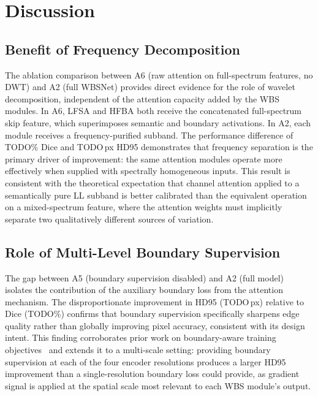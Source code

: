 \documentclass[journal]{IEEEtran}
\begin{document}
\section{Discussion}\label{sec:discussion}

\subsection{Benefit of Frequency Decomposition}

The ablation comparison between A6 (raw attention on full-spectrum features,
no DWT) and A2 (full WBSNet) provides direct evidence for the role of
wavelet decomposition, independent of the attention capacity added by the WBS
modules.
In A6, LFSA and HFBA both receive the concatenated full-spectrum skip feature,
which superimposes semantic and boundary activations.
In A2, each module receives a frequency-purified subband.
The performance difference of TODO\% Dice and TODO\,px HD95 demonstrates that
frequency separation is the primary driver of improvement: the same attention
modules operate more effectively when supplied with spectrally homogeneous
inputs.
This result is consistent with the theoretical expectation that channel
attention applied to a semantically pure LL subband is better calibrated than
the equivalent operation on a mixed-spectrum feature, where the attention
weights must implicitly separate two qualitatively different sources of
variation.

\subsection{Role of Multi-Level Boundary Supervision}

The gap between A5 (boundary supervision disabled) and A2 (full model)
isolates the contribution of the auxiliary boundary loss from the attention
mechanism.
The disproportionate improvement in HD95 (TODO\,px) relative to Dice (TODO\%)
confirms that boundary supervision specifically sharpens edge quality rather
than globally improving pixel accuracy, consistent with its design intent.
This finding corroborates prior work on boundary-aware training
objectives~\cite{kervadec2019boundaryloss} and extends it to a multi-scale
setting: providing boundary supervision at each of the four encoder
resolutions produces a larger HD95 improvement than a single-resolution
boundary loss could provide, as gradient signal is applied at the spatial
scale most relevant to each WBS module's output.
\end{document}
